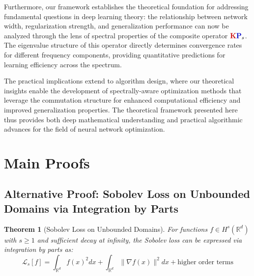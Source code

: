 \documentclass[a4paper]{article}
\newcommand{\Kop}{\textcolor{kernelcolor}{\mathbf{K}}}
\newcommand{\Pop}{\textcolor{sobolevcolor}{\mathbf{P}}}
\theoremstyle{plain}
\newtheorem{theorem}{Theorem}[section]
\theoremstyle{definition}
\theoremstyle{remark}
\begin{document}
Furthermore, our framework establishes the theoretical foundation for addressing fundamental questions in deep learning theory: the relationship between network width, regularization strength, and generalization performance can now be analyzed through the lens of spectral properties of the composite operator $\Kop\Pop_s$. The eigenvalue structure of this operator directly determines convergence rates for different frequency components, providing quantitative predictions for learning efficiency across the spectrum.

The practical implications extend to algorithm design, where our theoretical insights enable the development of spectrally-aware optimization methods that leverage the commutation structure for enhanced computational efficiency and improved generalization properties. The theoretical framework presented here thus provides both deep mathematical understanding and practical algorithmic advances for the field of neural network optimization.














































\newpage
\appendix
\section{Main Proofs}

\subsection{Alternative Proof: Sobolev Loss on Unbounded Domains via Integration by Parts}

\begin{theorem}[Sobolev Loss on Unbounded Domains]
For functions $f \in H^s(\mathbb{R}^d)$ with $s \geq 1$ and sufficient decay at infinity, the Sobolev loss can be expressed via integration by parts as:
\[ \mathcal{L}_s[f] = \int_{\mathbb{R}^d} f(x)^2 dx + \int_{\mathbb{R}^d} \|\nabla f(x)\|^2 dx + \text{higher order terms} \]
\end{theorem}
\end{document}
